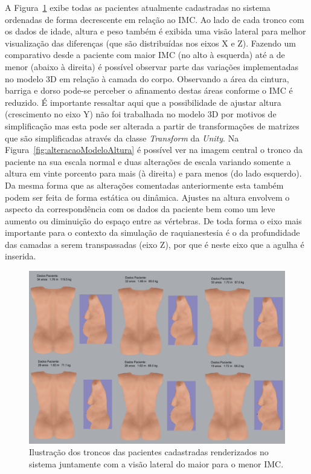 A Figura~\ref{fig:pacientesMaiorParaMenorIMCVisaoTroncoELateral} exibe todas as pacientes atualmente cadastradas no sistema ordenadas de forma decrescente em relação ao \acrshort{IMC}. Ao lado de cada tronco com os dados de idade, altura e peso também é exibida uma visão lateral para melhor visualização das diferenças (que são distribuídas nos eixos X e Z). Fazendo um comparativo desde a paciente com maior \acrshort{IMC} (no alto à esquerda) até a de menor (abaixo à direita) é possível observar parte das variações implementadas no modelo 3D em relação à camada do corpo. Observando a área da cintura, barriga e dorso pode-se perceber o afinamento destas áreas conforme o \acrshort{IMC} é reduzido. É importante ressaltar aqui que a possibilidade de ajustar altura (crescimento no eixo Y) não foi trabalhada no modelo 3D por motivos de simplificação mas esta pode ser alterada a partir de transformações de matrizes que são simplificadas através da classe \textit{Transform} da \textit{Unity}. Na Figura~\ref{fig:alteracaoModeloAltura} é possível ver na imagem central o tronco da paciente na sua escala normal e duas alterações de escala variando somente a altura em vinte porcento para mais (à direita) e para menos (do lado esquerdo). Da mesma forma que as alterações comentadas anteriormente esta também podem ser feita de forma estática ou dinâmica. Ajustes na altura envolvem o aspecto da correspondência com os dados da paciente bem como um leve aumento ou diminuição do espaço entre as vértebras. De toda forma o eixo mais importante para o contexto da simulação de raquianestesia é o da profundidade das camadas a serem transpassadas (eixo Z), por que é neste eixo que a agulha é inserida.

\begin{figure}[ht!]
    \centering
    \includegraphics[width=0.9\linewidth]{capitulos/figuras/pacientes cadastradas maior para menor imc visao tronco sentado e lateral.png} 
    \caption{Ilustração dos troncos das pacientes cadastradas renderizados no sistema juntamente com a visão lateral do maior para o menor IMC.}
    \label{fig:pacientesMaiorParaMenorIMCVisaoTroncoELateral}
\end{figure}

